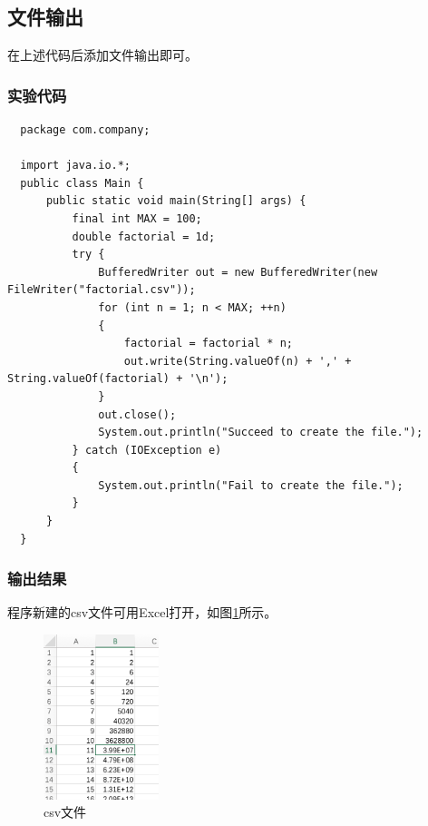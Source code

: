 \documentclass[11pt]{homework}
\begin{document}
\subsection*{文件输出}
在上述代码后添加文件输出即可。

\subsubsection*{实验代码}
\lstset{language=java}
\begin{lstlisting}
  package com.company;

  import java.io.*;
  public class Main {
      public static void main(String[] args) {
          final int MAX = 100;
          double factorial = 1d;
          try {
              BufferedWriter out = new BufferedWriter(new FileWriter("factorial.csv"));
              for (int n = 1; n < MAX; ++n)
              {
                  factorial = factorial * n;
                  out.write(String.valueOf(n) + ',' + String.valueOf(factorial) + '\n');
              }
              out.close();
              System.out.println("Succeed to create the file.");
          } catch (IOException e)
          {
              System.out.println("Fail to create the file.");
          }
      }
  }
\end{lstlisting}

\subsubsection*{输出结果}
程序新建的csv文件可用Excel打开，如图\ref{factorial_csv}所示。
\begin{figure}
  \centering
  \includegraphics[width=0.3\textwidth]{factorial_csv}
  \caption{csv文件}
  \label{factorial_csv}
\end{figure}
\end{document}
